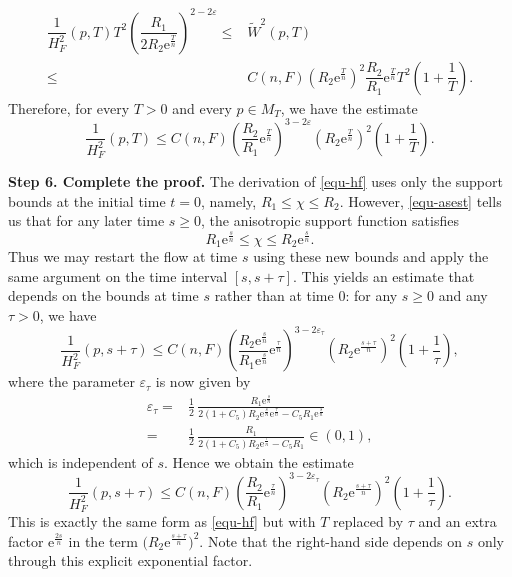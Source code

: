 \documentclass[11pt,reqno]{amsart}
\theoremstyle{definition}
\theoremstyle{remark}
\numberwithin{equation}{section}
\begin{document}
		\begin{align*}
			\dfrac{1}{H_F^2}(p,T)T^2\left(\dfrac{R_1}{2R_2\mathrm{e}^{\frac{T}{n}}} \right)^{2-2\varepsilon} \leq& \tilde{W}^2(p,T) \\
			\leq & C(n,F) \left(R_2 \mathrm{e}^{\frac{T}{n}}\right)^2 \dfrac{R_2}{R_1}\mathrm{e}^{\frac{T}{n}}T^2\left( 1 + \dfrac{1}{T} \right).
		\end{align*}
		Therefore, for every $T>0$ and every $p\in M_T$, we have the estimate
		\begin{equation}
			\dfrac{1}{H_F^2}(p,T) \leq C(n,F)\left( \dfrac{R_2}{R_1}\mathrm{e}^{\frac{T}{n}} \right)^{3-2\varepsilon}\left( R_2 \mathrm{e}^{\frac{T}{n}}\right)^2 \left(1+\dfrac{1}{T}\right).
			\label{equ-hf}
		\end{equation}
		
		\textbf{Step 6. Complete the proof.}
		The derivation of \eqref{equ-hf} uses only the support bounds at the initial time $t=0$, namely, $R_1\leq\chi\leq R_2$. However, \eqref{equ-asest} tells us that for any later time $s\geq 0$, the anisotropic support function satisfies
		\begin{equation*}
			R_1\mathrm{e}^{\frac{s}{n}}\leq \chi\leq R_2\mathrm{e}^{\frac{s}{n}}.
		\end{equation*}
		Thus we may restart the flow at time $s$ using these new bounds and apply the same argument on the time interval $[s,s+\tau]$. This yields an estimate that depends on the bounds at time $s$ rather than at time $0$: for any $s\geq 0$ and any $\tau>0$, we have
		\begin{equation*}
			\frac{1}{H_F^2}(p,s+\tau)\leq C(n,F)\left(\frac{R_2\mathrm{e}^{\frac{s}{n}}}{R_1\mathrm{e}^{\frac{s}{n}}}\mathrm{e}^{\frac{\tau}{n}}\right)^{3-2\varepsilon_{\tau}}
			\left(R_2\mathrm{e}^{\frac{s+\tau}{n}}\right)^2\left(1+\frac{1}{\tau}\right),
		\end{equation*}
		where the parameter $\varepsilon_{\tau}$ is now given by
		\begin{align*}
			\varepsilon_{\tau}=& \frac{1}{2}\,\frac{R_1\mathrm{e}^{\frac{s}{n}}}{2(1+C_5)R_2\mathrm{e}^{\frac{s}{n}}\mathrm{e}^{\frac{\tau}{n}}-C_5R_1\mathrm{e}^{\frac{s}{n}}}\\
			=& \frac{1}{2}\,\frac{R_1}{2(1+C_5)R_2\mathrm{e}^{\frac{\tau}{n}}-C_5R_1}\in (0,1),
		\end{align*}
		which is independent of $s$. Hence we obtain the estimate
		\begin{equation}
			\dfrac{1}{H_F^2}(p,s+\tau) \leq C(n,F)\left( \dfrac{R_2}{R_1}\mathrm{e}^{\frac{\tau}{n}} \right)^{3-2\varepsilon_{\tau}} \left( R_2 \mathrm{e}^{\frac{s+\tau}{n}} \right)^2 \left( 1+ \dfrac{1}{\tau} \right).
			\label{equ-hfbound}
		\end{equation}
		This is exactly the same form as \eqref{equ-hf} but with $T$ replaced by $\tau$ and an extra factor $\mathrm{e}^{\frac{2s}{n}}$ in the term $\bigl(R_2\mathrm{e}^{\frac{s+\tau}{n}}\bigr)^2$. Note that the right-hand side depends on $s$ only through this explicit exponential factor.
		
\end{document}
